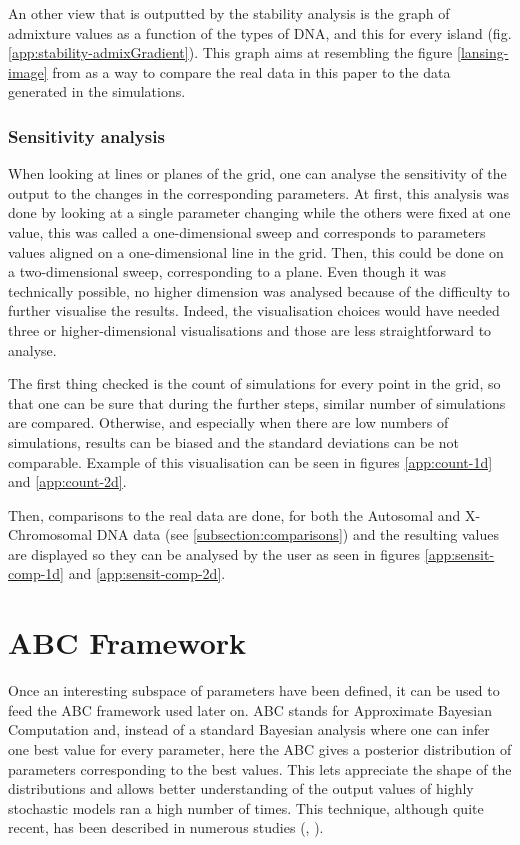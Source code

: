 \documentclass[a4paper,12pt]{report}
\begin{document}
An other view that is outputted by the stability analysis is the graph of admixture values as a function of the types of DNA, and this for every island (fig. \ref{app:stability-admixGradient}). This graph aims at resembling the figure \ref{lansing-image} from \cite{Lan01} as a way to compare the real data in this paper to the data generated in the simulations.


\subsubsection{Sensitivity analysis}
When looking at lines or planes of the grid, one can analyse the sensitivity of the output to the changes in the corresponding parameters.
At first, this analysis was done by looking at a single parameter changing while the others were fixed at one value, this was called a one-dimensional sweep and corresponds to parameters values aligned on a one-dimensional line in the grid. Then, this could be done on a two-dimensional sweep, corresponding to a plane. Even though it was technically possible, no higher dimension was analysed because of the difficulty to further visualise the results. Indeed, the visualisation choices would have needed three or higher-dimensional visualisations and those are less straightforward to analyse.

The first thing checked is the count of simulations for every point in the grid, so that one can be sure that during the further steps, similar number of simulations are compared. Otherwise, and especially when there are low numbers of simulations, results can be biased and the standard deviations can be not comparable. Example of this visualisation can be seen in figures \ref{app:count-1d} and \ref{app:count-2d}.

Then, comparisons to the real data are done, for both the Autosomal and X-Chromosomal DNA data (see \ref{subsection:comparisons}) and the resulting values are displayed so they can be analysed by the user as seen in figures \ref{app:sensit-comp-1d} and \ref{app:sensit-comp-2d}.


\section{ABC Framework}
Once an interesting subspace of parameters have been defined, it can be used to feed the ABC framework used later on. ABC stands for Approximate Bayesian Computation and, instead of a standard Bayesian analysis where one can infer one best value for every parameter, here the ABC gives a posterior distribution of parameters corresponding to the best values. This lets appreciate the shape of the distributions and allows better understanding of the output values of highly stochastic models ran a high number of times. This technique, although quite recent, has been described in numerous studies (\cite{Sun01}, \cite{Csi02}).
\end{document}
